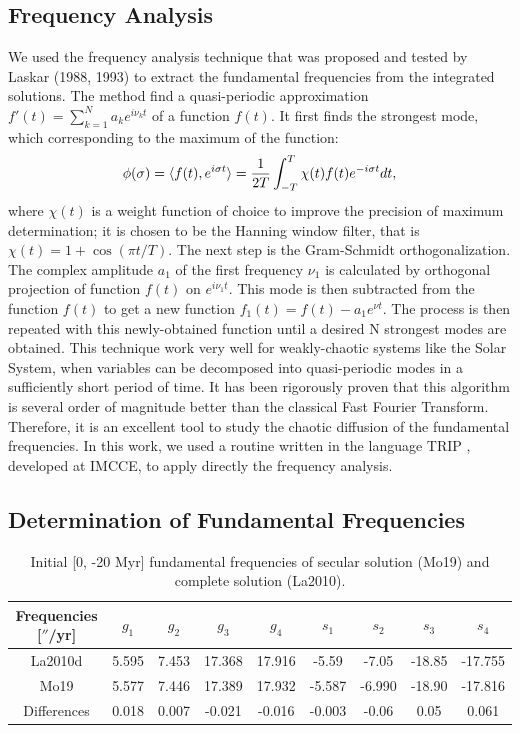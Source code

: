 \documentclass[12pt]{article}
\begin{document}
	\subsection{Frequency Analysis} \label{sect:FA}
	We used the frequency analysis technique that was proposed and tested by Laskar (1988, 1993) to extract the fundamental frequencies from the integrated solutions. The method find a quasi-periodic approximation $f'(t) = \sum_{k=1}^N a_k e^{i\nu_k t}$ of a function $f(t)$. It first finds the strongest mode, which corresponding  to the maximum of the function: 
	\begin{equation}
	\phi (\sigma) = \braket{f(t), e^{i \sigma t}} = \frac{1}{2T} \int^T_{-T} \chi( t ) f(t) e^{-i \sigma t} dt, 
	\end{equation}
	where $\chi (t)$ is a weight function of choice to improve the precision of maximum determination; it is chosen to be the Hanning window filter, that is $\chi(t) = 1 + \cos(\pi t/T )$. The next step is the Gram-Schmidt orthogonalization. The complex amplitude $a_1$ of the first frequency  $\nu_1$ is calculated by orthogonal projection of function $f(t)$ on  $e^{i\nu_1 t}$. This mode is then subtracted from the function $f(t)$ to get a new function $f_1(t) = f(t) - a_1 e^{\nu t}$. The process is then repeated with this newly-obtained function until a desired N strongest modes are obtained. This technique work very well for weakly-chaotic systems like the Solar System, when variables can be decomposed into quasi-periodic modes in a sufficiently short period of time. It has been rigorously proven that this algorithm is several order of magnitude better than the classical Fast Fourier Transform. Therefore, it is an excellent tool to study the chaotic diffusion of the fundamental frequencies. In this work, we used a routine written in the language TRIP \citep{gastineau2011trip}, developed at IMCCE, to apply directly the frequency analysis.
	
	\subsection{Determination of Fundamental Frequencies} \label{sec:det_freq}

	\begin{table}[ht]
		\centering
		\begin{tabular}{ccccccccc}
			\toprule
			Frequencies [$''$/yr] &     $g_1$&     $g_2$ & $g_3$ & $g_4$ & $s_1$&     $s_2$ & $s_3$ & $s_4$ \\    
			\midrule
			La2010d &  5.595&     7.453 & 17.368 & 17.916 & -5.59 & -7.05 & -18.85 & -17.755 \\
			Mo19 &     5.577&     7.446 & 17.389 & 17.932 & -5.587 & -6.990 & -18.90 & -17.816\\
			Differences &     0.018 & 0.007 & -0.021 &-0.016 & -0.003 & -0.06 & 0.05 & 0.061 \\
			\bottomrule
		\end{tabular} 
		\caption{Initial  [0, -20 Myr]  fundamental frequencies of secular solution (Mo19) and complete solution (La2010).}
		\label{table:ini}
	\end{table}
	
\end{document}
